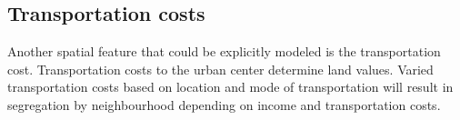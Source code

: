 \subsection{Transportation costs} %
Another spatial feature that could be explicitly modeled is %
the transportation cost. Transportation costs to the urban center determine land values. %
Varied transportation costs based on location and mode of transportation will result in segregation by neighbourhood depending on income and transportation costs. 

